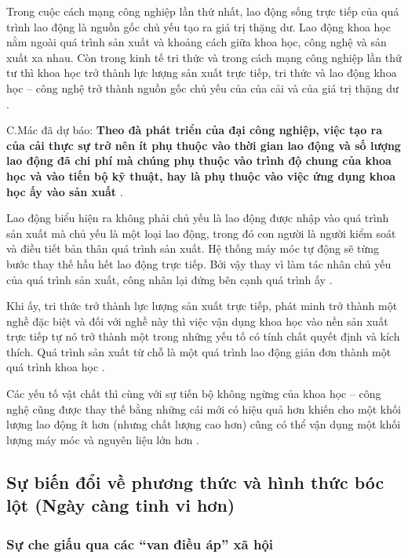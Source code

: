 Trong cuộc cách mạng công nghiệp lần thứ nhất, lao động sống trực tiếp của quá trình lao động là nguồn gốc chủ yếu tạo ra giá trị thặng dư. Lao động khoa học nằm ngoài quá trình sản xuất và khoảng cách giữa khoa học, công nghệ và sản xuất xa nhau. Còn trong kinh tế tri thức và trong cách mạng công nghiệp lần thứ tư thì khoa học trở thành lực lượng sản xuất trực tiếp, tri thức và lao động khoa học -- công nghệ trở thành nguồn gốc chủ yếu của của cải và của giá trị thặng dư \cite{do_the_tung_gttd}.

C.Mác đã dự báo: \textbf{Theo đà phát triển của đại công nghiệp, việc tạo ra của cải thực sự trở nên ít phụ thuộc vào thời gian lao động và số lượng lao động đã chi phí mà chúng phụ thuộc vào trình độ chung của khoa học và vào tiến bộ kỹ thuật, hay là phụ thuộc vào việc ứng dụng khoa học ấy vào sản xuất} \cite{do_the_tung_gttd, marx_toantp_t46p2}.

Lao động biểu hiện ra không phải chủ yếu là lao động được nhập vào quá trình sản xuất mà chủ yếu là một loại lao động, trong đó con người là người kiểm soát và điều tiết bản thân quá trình sản xuất. Hệ thống máy móc tự động sẽ từng bước thay thế hầu hết lao động trực tiếp. Bởi vậy thay vì làm tác nhân chủ yếu của quá trình sản xuất, công nhân lại đứng bên cạnh quá trình ấy \cite{do_the_tung_gttd, marx_toantp_t46p2}.

Khi ấy, tri thức trở thành lực lượng sản xuất trực tiếp, phát minh trở thành một nghề đặc biệt và đối với nghề này thì việc vận dụng khoa học vào nền sản xuất trực tiếp tự nó trở thành một trong những yếu tố có tính chất quyết định và kích thích. Quá trình sản xuất từ chỗ là một quá trình lao động giản đơn thành một quá trình khoa học \cite{do_the_tung_gttd, marx_toantp_t46p2}.

Các yếu tố vật chất thì cùng với sự tiến bộ không ngừng của khoa học -- công nghệ cũng được thay thế bằng những cái mới có hiệu quả hơn khiến cho một khối lượng lao động ít hơn (nhưng chất lượng cao hơn) cũng có thể vận dụng một khối lượng máy móc và nguyên liệu lớn hơn \cite{do_the_tung_gttd, marx_toantp_t46p2}.

\subsection{Sự biến đổi về phương thức và hình thức bóc lột (Ngày càng tinh vi hơn)}

\subsubsection{Sự che giấu qua các ``van điều áp'' xã hội}


